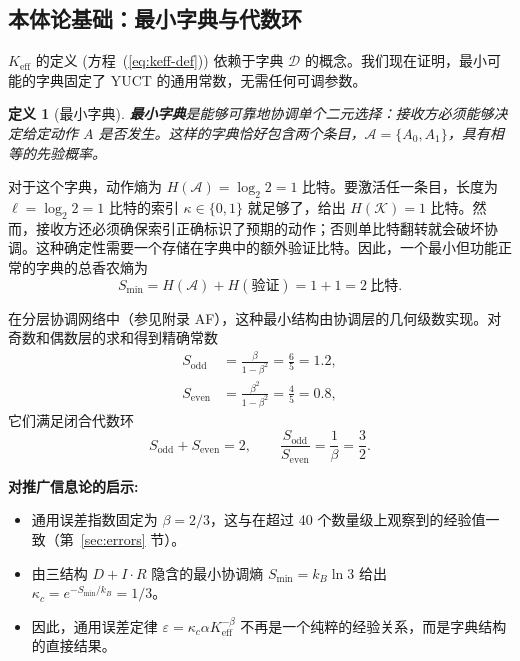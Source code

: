 \documentclass[12pt,a4paper]{article}
\newtheorem{definition}[theorem]{定义}
\theoremstyle{remark}
\begin{document}
	\subsection{本体论基础：最小字典与代数环}
	\label{subsec:minimal-dict}
	
	\(K_{\mathrm{eff}}\) 的定义 (方程~(\ref{eq:keff-def})) 依赖于字典 \(\mathcal{D}\) 的概念。我们现在证明，最小可能的字典固定了 YUCT 的通用常数，无需任何可调参数。
	
	\begin{definition}[最小字典]
		\textbf{最小字典}是能够可靠地协调单个二元选择：接收方必须能够决定给定动作 \(A\) 是否发生。这样的字典恰好包含两个条目，\(\mathcal{A} = \{A_0, A_1\}\)，具有相等的先验概率。
	\end{definition}
	
	对于这个字典，动作熵为 \(H(\mathcal{A}) = \log_2 2 = 1\) 比特。要激活任一条目，长度为 \(\ell = \log_2 2 = 1\) 比特的索引 \(\kappa \in \{0,1\}\) 就足够了，给出 \(H(\mathcal{K}) = 1\) 比特。然而，接收方还必须确保索引正确标识了预期的动作；否则单比特翻转就会破坏协调。这种确定性需要一个存储在字典中的额外验证比特。因此，一个最小但功能正常的字典的总香农熵为
	\begin{equation}
		S_{\min} = H(\mathcal{A}) + H(\text{验证}) = 1 + 1 = 2\ \text{比特}.
		\label{eq:smin}
	\end{equation}
	
	在分层协调网络中（参见附录 AF），这种最小结构由协调层的几何级数实现。对奇数和偶数层的求和得到精确常数
	\begin{align}
		S_{\mathrm{odd}} &= \frac{\beta}{1-\beta^{2}} = \frac{6}{5} = 1.2, \label{eq:sodd-appx}\\
		S_{\mathrm{even}} &= \frac{\beta^{2}}{1-\beta^{2}} = \frac{4}{5} = 0.8, \label{eq:seven-appx}
	\end{align}
	它们满足闭合代数环
	\begin{equation}
		S_{\mathrm{odd}} + S_{\mathrm{even}} = 2, \qquad
		\frac{S_{\mathrm{odd}}}{S_{\mathrm{even}}} = \frac{1}{\beta} = \frac{3}{2}.
		\label{eq:algebraic-loop-appx}
	\end{equation}
	
	\textbf{对推广信息论的启示:}
	\begin{itemize}
		\item 通用误差指数固定为 \(\beta = 2/3\)，这与在超过 40 个数量级上观察到的经验值一致（第~\ref{sec:errors} 节）。
		\item 由三结构 \(D+I\!\cdot\!R\) 隐含的最小协调熵 \(S_{\min} = k_B \ln 3\) 给出 \(\kappa_c = e^{-S_{\min}/k_B} = 1/3\)。
		\item 因此，通用误差定律 \(\varepsilon = \kappa_c \alpha K_{\mathrm{eff}}^{-\beta}\) 不再是一个纯粹的经验关系，而是字典结构的直接结果。
	\end{itemize}
	
\end{document}

